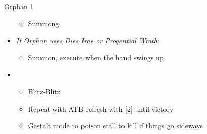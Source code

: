 \begin{battle}{Orphan 1}
\begin{multicols}{2}
\begin{itemize}
\begin{itemize}
        \item Summong
    \end{itemize}
    \item \textit{If Orphan uses Dies Irae or Progential Wrath}:
    \begin{itemize}
        \item Summon, execute when the hand swings up
    \end{itemize}
    \item \first
    \begin{itemize}
        \item Blitz-Blitz
        \item Repeat with ATB refresh with [2] until victory
        \item Gestalt mode to poison stall to kill if things go sideways
    \end{itemize}
\end{itemize}
\end{multicols}
\end{battle}
